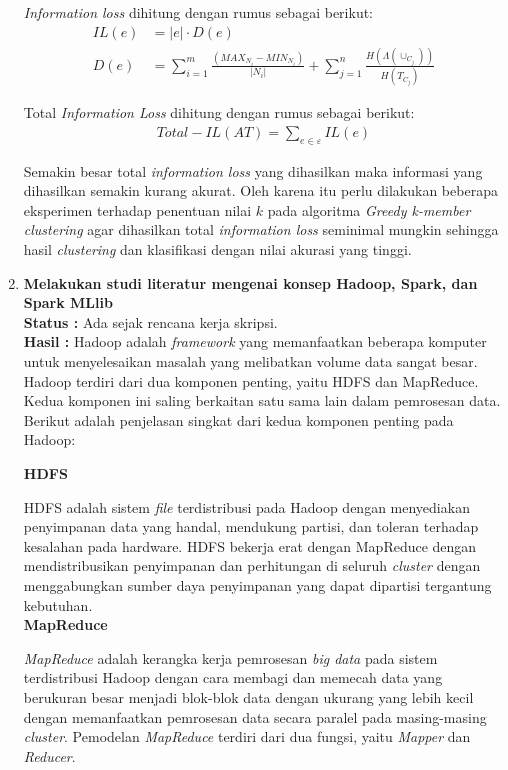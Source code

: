 \documentclass[a4paper,twoside]{article}
\begin{document}
\begin{enumerate}
\noindent \textit{Information loss} dihitung dengan rumus sebagai berikut:
\begin{align}
IL(e)&= |e| \cdot D(e) \\
D(e) &= \sum_{i=1}^{m} \frac{(MAX_{N_i} - MIN_{N_i})}{|N_i|} + \sum_{j=1}^{n}\frac{H(\Lambda(\cup_{C_j}))}{H(T_{C_j})}
\end{align}

\noindent Total \textit{Information Loss} dihitung dengan rumus sebagai berikut:
\begin{align}
Total-IL(AT) = \sum_{e \in \varepsilon}^{}  IL(e)
\end{align}

\noindent Semakin besar total \textit{information loss} yang dihasilkan maka informasi yang dihasilkan semakin kurang akurat. Oleh karena itu perlu dilakukan beberapa eksperimen terhadap penentuan nilai $k$ pada algoritma \textit{Greedy k-member clustering} agar dihasilkan total \textit{information loss} seminimal mungkin sehingga hasil \textit{clustering} dan klasifikasi dengan nilai akurasi yang tinggi.	
		
		
		\item \textbf{Melakukan studi literatur mengenai konsep Hadoop, Spark, dan Spark MLlib}\\
		{\bf Status :} Ada sejak rencana kerja skripsi.\\
		{\bf Hasil :} Hadoop adalah \textit{framework} yang memanfaatkan beberapa komputer untuk menyelesaikan masalah yang melibatkan volume data sangat besar. Hadoop terdiri dari dua komponen penting, yaitu HDFS dan MapReduce. Kedua komponen ini saling berkaitan satu sama lain dalam pemrosesan data. Berikut adalah penjelasan singkat dari kedua komponen penting pada Hadoop:

\vspace{0.3cm}
\textbf{HDFS}

HDFS adalah sistem \textit{file} terdistribusi pada Hadoop dengan menyediakan penyimpanan data yang handal, mendukung partisi, dan toleran terhadap kesalahan pada hardware. HDFS bekerja erat dengan MapReduce dengan mendistribusikan penyimpanan dan perhitungan di seluruh \textit{cluster} dengan menggabungkan sumber daya penyimpanan yang dapat dipartisi tergantung kebutuhan. \\

\newpage
\textbf{MapReduce}

\textit{MapReduce} adalah kerangka kerja pemrosesan \textit{big data} pada sistem terdistribusi Hadoop dengan cara membagi dan memecah data yang berukuran besar menjadi blok-blok data dengan ukurang yang lebih kecil dengan memanfaatkan pemrosesan data secara paralel pada masing-masing \textit{cluster}. Pemodelan \textit{MapReduce} terdiri dari dua fungsi, yaitu \textit{Mapper} dan \textit{Reducer}. 


\end{enumerate}
\end{document}

